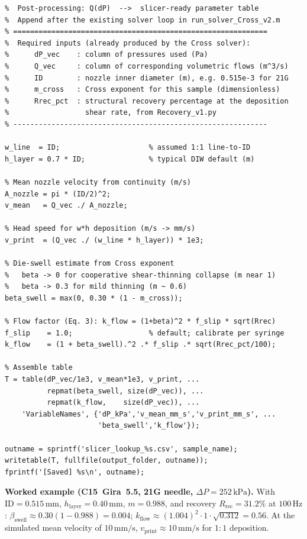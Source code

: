\documentclass[11pt,a4paper]{article}
\newcommand{\mms}{\,\mathrm{mm/s}}
\begin{document}
\begin{lstlisting}[style=matlab,caption={Post-processing block to append to
\texttt{run\_solver\_Cross\_v2.m}. Produces a CSV
\texttt{slicer\_lookup\_<sample>.csv} per ink.},label={lst:matlab_postproc}]
% ============================================================
%  Post-processing: Q(dP)  -->  slicer-ready parameter table
%  Append after the existing solver loop in run_solver_Cross_v2.m
% ============================================================
%  Required inputs (already produced by the Cross solver):
%      dP_vec    : column of pressures used (Pa)
%      Q_vec     : column of corresponding volumetric flows (m^3/s)
%      ID        : nozzle inner diameter (m), e.g. 0.515e-3 for 21G
%      m_cross   : Cross exponent for this sample (dimensionless)
%      Rrec_pct  : structural recovery percentage at the deposition
%                  shear rate, from Recovery_v1.py
% ------------------------------------------------------------

w_line  = ID;                     % assumed 1:1 line-to-ID
h_layer = 0.7 * ID;               % typical DIW default (m)

% Mean nozzle velocity from continuity (m/s)
A_nozzle = pi * (ID/2)^2;
v_mean   = Q_vec ./ A_nozzle;

% Head speed for w*h deposition (m/s -> mm/s)
v_print  = (Q_vec ./ (w_line * h_layer)) * 1e3;

% Die-swell estimate from Cross exponent
%   beta -> 0 for cooperative shear-thinning collapse (m near 1)
%   beta -> 0.3 for mild thinning (m ~ 0.6)
beta_swell = max(0, 0.30 * (1 - m_cross));

% Flow factor (Eq. 3): k_flow = (1+beta)^2 * f_slip * sqrt(Rrec)
f_slip    = 1.0;                  % default; calibrate per syringe
k_flow    = (1 + beta_swell).^2 .* f_slip .* sqrt(Rrec_pct/100);

% Assemble table
T = table(dP_vec/1e3, v_mean*1e3, v_print, ...
          repmat(beta_swell, size(dP_vec)), ...
          repmat(k_flow,    size(dP_vec)), ...
    'VariableNames', {'dP_kPa','v_mean_mm_s','v_print_mm_s', ...
                      'beta_swell','k_flow'});

outname = sprintf('slicer_lookup_%s.csv', sample_name);
writetable(T, fullfile(output_folder, outname));
fprintf('[Saved] %s\n', outname);
\end{lstlisting}

\noindent\textbf{Worked example (C15~Gira~5.5, 21G needle, $\Delta P=252\,\mathrm{kPa}$).}
With $\mathrm{ID}=0.515\,\mathrm{mm}$, $h_\mathrm{layer}=0.40\,\mathrm{mm}$,
$m=0.988$, and recovery $R_\mathrm{rec}=31.2\%$ at $100\,\mathrm{Hz}$:
$\beta_\mathrm{swell}\approx 0.30(1-0.988)=0.004$;
$k_\mathrm{flow}\approx (1.004)^2\cdot 1\cdot\sqrt{0.312}=0.56$.
At the simulated mean velocity of $10\mms$,
$v_\mathrm{print}\approx 10\mms$ for $1{:}1$ deposition.
\end{document}
